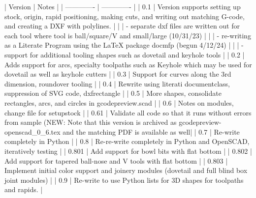 \documentclass{ltxdoc}
\begin{document}
\begin{readme}
| Version       | Notes         |
| ------------- | ------------- |
| 0.1           | Version  supports setting up stock, origin, rapid positioning, making cuts, and writing out matching G-code, and creating a DXF with polylines.                                 |
|               |  - separate dxf files are written out for each tool where tool is ball/square/V and small/large (10/31/23)                                                                      |
|               |  - re-writing as a Literate Program using the LaTeX package docmfp (begun 4/12/24)                                                                                              |
|               |  - support for additional tooling shapes such as dovetail and keyhole tools                                                                                                     |
| 0.2           | Adds support for arcs, specialty toolpaths such as Keyhole which may be used for dovetail as well as keyhole cutters                                                            |
| 0.3           | Support for curves along the 3rd dimension, roundover tooling                                                                                                                   |
| 0.4           | Rewrite using literati documentclass, suppression of SVG code, dxfrectangle                                                                                                     |
| 0.5           | More shapes, consolidate rectangles, arcs, and circles in gcodepreview.scad                                                                                                     |
| 0.6           | Notes on modules, change file for setupstock                                                                                                                                    |
| 0.61          | Validate all code so that it runs without errors from sample (NEW: Note that this version is archived as gcodepreview-openscad_0_6.tex and the matching PDF is available as well|
| 0.7           | Re-write completely in Python                                                                                                                                                   |
| 0.8           | Re-re-write completely in Python and OpenSCAD, iteratively testing                                                                                                              |
| 0.801         | Add support for bowl bits with flat bottom                                                                                                                                      |
| 0.802         | Add support for tapered ball-nose and  V tools with flat bottom                                                                                                                 |
| 0.803         | Implement initial color support and joinery modules (dovetail and full blind box joint modules)                                                                                |
| 0.9           | Re-write to use Python lists for 3D shapes for toolpaths and rapids.                                |


\end{readme}
\end{document}
